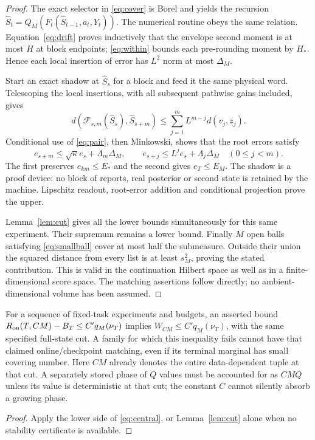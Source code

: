 \begin{proof}
The exact selector in \eqref{eq:cover} is Borel and yields the recursion $\widehat S_t=Q_M(F_t(\widehat S_{t-1},a_t,Y_t))$. The numerical routine obeys the same relation. Equation~\eqref{eq:drift} proves inductively that the envelope second moment is at most $H$ at block endpoints; \eqref{eq:within} bounds each pre-rounding moment by $H_*$. Hence each local insertion of error has $L^2$ norm at most $\Delta_M$.

Start an exact shadow at $\widehat S_s$ for a block and feed it the same physical word. Telescoping the local insertions, with all subsequent pathwise gains included, gives
\[
 d(\mathscr F_{s,m}(\widehat S_s),\widehat S_{s+m})
 \le\sum_{j=1}^m L^{m-j}d(v_j,z_j).
\]
Conditional use of \eqref{eq:pair}, then Minkowski, shows that the root errors satisfy
\[
 e_{s+m}\le\sqrt\kappa e_s+\Lambda_m\Delta_M,
 \qquad e_{s+j}\le L^je_s+\Lambda_j\Delta_M\quad(0\le j<m).
\]
The first preserves $e_{km}\le E_*$ and the second gives $e_T\le E_M$. The shadow is a proof device: no block of reports, real posterior or second state is retained by the machine. Lipschitz readout, root-error addition and conditional projection prove the upper.

Lemma~\ref{lem:cut} gives all the lower bounds simultaneously for this same experiment. Their supremum remains a lower bound. Finally $M$ open balls satisfying \eqref{eq:smallball} cover at most half the submeasure. Outside their union the squared distance from every list is at least $s_M^2$, proving the stated contribution. This is valid in the continuation Hilbert space as well as in a finite-dimensional score space. The matching assertions follow directly; no ambient-dimensional volume has been assumed.
\end{proof}

\begin{corollary}\label{cor:necessary}
For a sequence of fixed-task experiments and budgets, an asserted bound
$R_{\mathrm{on}}(T,CM)-B_T\le C' q_M(\nu_T)$ implies
$W_{CM}\le C' q_M(\nu_T)$, with the same specified full-state cut. A family for which this inequality fails cannot have that claimed online/checkpoint matching, even if its terminal marginal has small covering number. Here $CM$ already denotes the entire data-dependent tuple at that cut. A separately stored phase of $Q$ values must be accounted for as $CMQ$ unless its value is deterministic at that cut; the constant $C$ cannot silently absorb a growing phase.
\end{corollary}
\begin{proof}
Apply the lower side of \eqref{eq:central}, or Lemma~\ref{lem:cut} alone when no stability certificate is available.
\end{proof}


